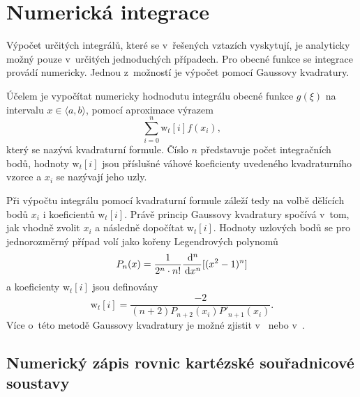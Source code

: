 \section{Numerická integrace}
Výpočet určitých integrálů, které se v~řešených vztazích vyskytují, je analyticky možný pouze v~určitých jednoduchých případech. Pro obecné funkce se integrace provádí numericky. Jednou z~možností je výpočet pomocí Gaussovy kvadratury.

Účelem je vypočítat numericky hodnodutu integrálu obecné funkce $g(\xi)$ na intervalu $x\in\langle a, b\rangle$,  pomocí aproximace výrazem
\begin{displaymath}
\sum_{i=0}^{n}\mathrm{w}_{t}[i]f(x_{i}),
\end{displaymath}
který se nazývá kvadraturní formule. Číslo $n$ představuje počet integračních bodů, hodnoty $\mathrm{w}_{t}[i]$ jsou příslušné váhové koeficienty uvedeného kvadraturního vzorce a $x_{i}$ se nazývají jeho uzly. 

Při výpočtu integrálu pomocí kvadraturní formule záleží tedy na volbě dělících bodů $x_{i}$ i koeficientů $\mathrm{w}_{t}[i]$. Právě princip Gaussovy kvadratury spočívá v~tom, jak vhodně zvolit $x_{i}$ a následně dopočítat $\mathrm{w}_{t}[i]$. Hodnoty uzlových bodů se pro jednorozměrný případ volí jako kořeny Legendrových polynomů
\begin{displaymath}
	P_{n}(x) = \frac{1}{2^{n}\cdot n!}\frac{\,\mathrm{d}^{n}}{\,\mathrm{d} x^{n}}[(x^{2} - 1)^{n}]
\end{displaymath}
a koeficienty $\mathrm{w}_{t}[i]$ jsou definovány
\begin{displaymath}
\mathrm{w}_{t}[i] = \frac{-2}{(n+2)P_{n+2}(x_i)P'_{n+1}(x_i)}.
\end{displaymath}
Více o~této metodě Gaussovy kvadratury je možné zjistit v~\cite{gk_tichy} nebo v~\cite{gk_kaw}.

\subsection{Numerický zápis rovnic kartézské souřadnicové soustavy}
